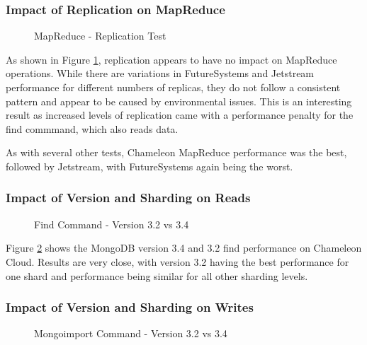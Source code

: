 \documentclass[sigconf]{acmart}
\begin{document}
\subsubsection{Impact of Replication on MapReduce}

\begin{figure}[htbp]
\centering
{}
\caption{MapReduce - Replication Test}
\label{fig:replica-mapreduce}
\end{figure}

As shown in Figure \ref{fig:replica-mapreduce}, replication appears to
have no impact on MapReduce operations.  While there are variations in
FutureSystems and Jetstream performance for different numbers of
replicas, they do not follow a consistent pattern and appear to be
caused by environmental issues.  This is an interesting result as
increased levels of replication came with a performance penalty for
the find commmand, which also reads data.

As with several other tests, Chameleon MapReduce performance was the
best, followed by Jetstream, with FutureSystems again being the worst.


\subsubsection{Impact of Version and Sharding on Reads}


\begin{figure}[htbp]
\centering
{}
\caption{Find Command - Version 3.2 vs 3.4}
\label{fig:version-find}
\end{figure}

Figure \ref{fig:version-find} shows the MongoDB version 3.4 and 3.2
find performance on Chameleon Cloud.  Results are very close, with
version 3.2 having the best performance for one shard and performance
being similar for all other sharding levels.

\subsubsection{Impact of Version and Sharding on Writes}

\begin{figure}[htbp]
\centering
{}
\caption{Mongoimport Command - Version 3.2 vs 3.4}
\label{fig:version-import}
\end{figure}
\end{document}
